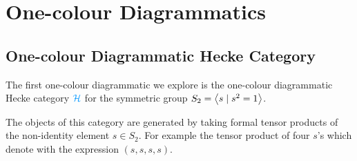 \chapter{One-colour Diagrammatics}

\section{One-colour Diagrammatic Hecke Category}

The first one-colour diagrammatic we explore is the one-colour diagrammatic Hecke category $\blue\cH$ for the symmetric group $S_2 = {\left\langle s \mathrel{|} s^2 = 1 \right\rangle}$. %

The objects of this category are generated by taking formal tensor products of the non-identity element $s \in S_2$. For example the tensor product of four $s$'s which denote with the expression $(s,s,s,s)$.

